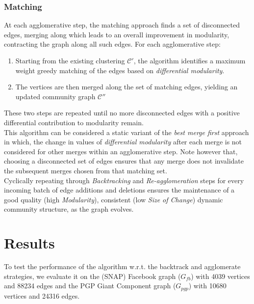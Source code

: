 \documentclass[conference]{IEEEtran}
\begin{document}
\subsubsection{Matching}
At each agglomerative step, the matching approach finds a set of 
disconnected edges, merging along which leads to an overall improvement in 
modularity, contracting the graph along all such edges. For each agglomerative 
step:
\begin{enumerate}
\item Starting from the existing clustering $\mathcal{C'}$, the algorithm 
identifies a maximum weight greedy matching of the edges based on 
\emph{differential modularity}.
\item The vertices are then merged along the set of matching edges, yielding an 
updated community graph $\mathcal{C''}$
\end{enumerate}
These two steps are repeated until no more disconnected edges with a positive 
differential contribution to modularity remain.\\
This algorithm can be considered a static variant of the \textit{best merge 
first} approach in which, the change in values of \emph{differential 
modularity} after each merge is not considered for other merges within an 
agglomerative step. Note however that, choosing a disconnected set of edges 
ensures that any merge does not invalidate the subsequent merges chosen from 
that matching set.\\
Cyclically repeating through \emph{Backtracking} and \emph{Re-agglomeration} 
steps for every incoming batch of edge additions and deletions ensures the 
maintenance of a good quality (high \emph{Modularity}), consistent (low 
\emph{Size of Change}) dynamic community structure, as the graph evolves.
\section{Results}
To test the performance of the algorithm w.r.t. the backtrack and 
agglomerate strategies, we evaluate it on the (SNAP) Facebook graph 
\cite{fb} ($G_{fb}$) with 4039 vertices and 88234 edges and the PGP Giant 
Component graph \cite{pgp} ($G_{pgp}$) with 10680 vertices and 24316 edges.
\end{document}
